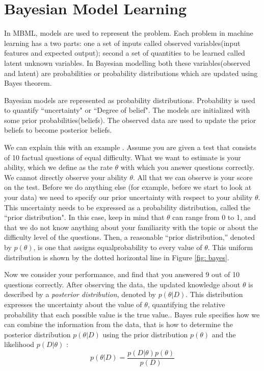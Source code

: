 \section{Bayesian Model Learning}

In MBML, models are used to represent the problem. Each problem in machine learning has a two parts: one a set of inputs called observed variables(input features and expected output); second a set of  quantities to be learned called latent unknown variables. In Bayesian modelling both these variables(observed and latent) are probabilities or probability distributions which are updated using Bayes theorem. 

Bayesian models are represented as probability distributions. Probability is used to quantify ``uncertainty" or ``Degree of belief". The models are initialized with some prior probabilities(beliefs). The observed data are used to update the prior beliefs to become posterior beliefs.

We can explain this with an example \cite{lee2014bayesian}. Assume you
are given a test that consists of 10 factual questions of equal difficulty. What we want to estimate is your ability, which we define as the rate $\theta$ with which you answer questions correctly. We cannot directly observe your ability $\theta$. All that we can observe is your score on the test. Before we do anything else (for example, before we start to look at your data) we need to specify our prior uncertainty with respect to your ability $\theta$. This uncertainty needs to be expressed as a probability distribution, called the ``prior distribution". In this case, keep in mind that $\theta$ can range from 0 to 1, and that we do not know anything about your familiarity with the topic or about the difficulty level of the questions. Then, a reasonable ``prior distribution,” denoted by $p(\theta)$, is one that assigns equalprobability to every value of $\theta$. This uniform distribution is shown by the dotted horizontal line in Figure \ref{fig: bayes}.

Now we consider your performance, and find that you answered 9
out of 10 questions correctly. After observing the data, the updated knowledge about $\theta$ is described by a \emph{posterior distribution}, denoted by $p(\theta | D)$. This distribution expresses the uncertainty about the value of $\theta$, quantifying the relative probability that each possible value is the true value.. Bayes rule specifies how we can combine the information from the data, that is how to determine the posterior distribution $p (\theta | D)$ using  the prior distribution $p(\theta)$ and the likelihood  $p (D | \theta)$ :
\begin{equation}
	p(\theta | D) = \frac{p(D | \theta) p(\theta)}{p(D)}
\end{equation}

